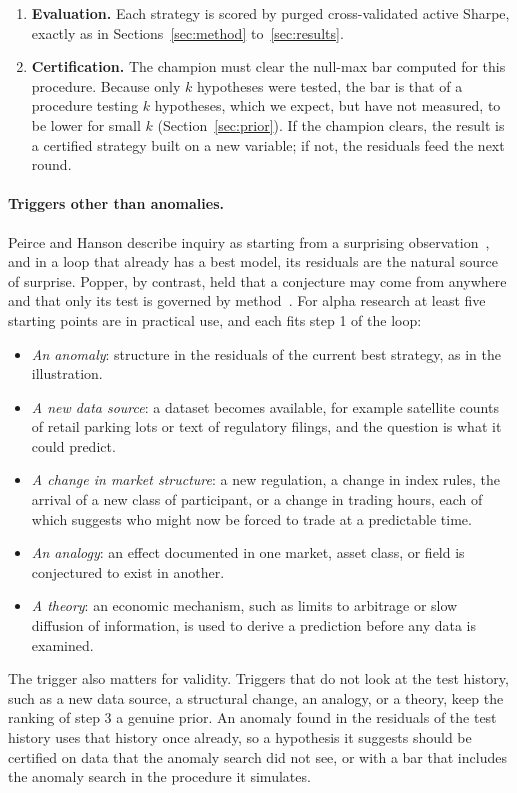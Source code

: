 \documentclass[11pt]{article}
\begin{document}
\begin{enumerate}[leftmargin=1.6em]
that use the new variables.
\item \textbf{Evaluation.} Each strategy is scored by purged cross-validated active Sharpe, exactly as in
Sections~\ref{sec:method} to~\ref{sec:results}.
\item \textbf{Certification.} The champion must clear the null-max bar computed for this procedure.
Because only $k$ hypotheses were tested, the bar is that of a procedure testing $k$ hypotheses, which we
expect, but have not measured, to be lower for small $k$ (Section~\ref{sec:prior}). If the champion clears, the
result is a certified strategy built on a new variable; if not, the residuals feed the next round.
\end{enumerate}

\paragraph{Triggers other than anomalies.} Peirce and Hanson describe inquiry as starting from a
surprising observation~\cite{peirce,hanson}, and in a loop that already has a best model, its residuals
are the natural source of surprise. Popper, by contrast, held that a conjecture may come from anywhere and
that only its test is governed by method~\cite{popper}. For alpha research at least five starting points
are in practical use, and each fits step 1 of the loop:
\begin{itemize}[leftmargin=1.4em]
\item \emph{An anomaly}: structure in the residuals of the current best strategy, as in the illustration.
\item \emph{A new data source}: a dataset becomes available, for example satellite counts of retail
parking lots or text of regulatory filings, and the question is what it could predict.
\item \emph{A change in market structure}: a new regulation, a change in index rules, the arrival of a new
class of participant, or a change in trading hours, each of which suggests who might now be forced to
trade at a predictable time.
\item \emph{An analogy}: an effect documented in one market, asset class, or field is conjectured to
exist in another.
\item \emph{A theory}: an economic mechanism, such as limits to arbitrage or slow diffusion of
information, is used to derive a prediction before any data is examined.
\end{itemize}
The trigger also matters for validity. Triggers that do not look at the test history, such as a new data
source, a structural change, an analogy, or a theory, keep the ranking of step 3 a genuine prior. An
anomaly found in the residuals of the test history uses that history once already, so a hypothesis it
suggests should be certified on data that the anomaly search did not see, or with a bar that includes the
anomaly search in the procedure it simulates.
\end{document}
